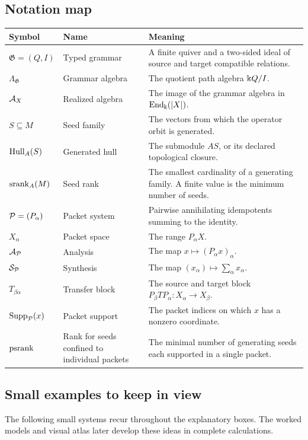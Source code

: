 \subsection*{Notation map}
\begin{center}
\begin{longtable}{@{}p{}p{}p{}@{}}
\toprule
\textbf{Symbol} & \textbf{Name} & \textbf{Meaning}\\
\midrule
\endhead
\(\mathfrak G=(Q,I)\) & Typed grammar & A finite quiver and a two-sided ideal of source and target compatible relations.\\
\(\Lambda_{\mathfrak G}\) & Grammar algebra & The quotient path algebra \(\Bbbk Q/I\).\\
\(\mathcal A_X\) & Realized algebra & The image of the grammar algebra in \(\operatorname{End}_{\Bbbk}(|X|)\).\\
\(S\subseteq M\) & Seed family & The vectors from which the operator orbit is generated.\\
\(\operatorname{Hull}_A(S)\) & Generated hull & The submodule \(AS\), or its declared topological closure.\\
\(\operatorname{srank}_A(M)\) & Seed rank & The smallest cardinality of a generating family. A finite value is the minimum number of seeds.\\
\(\mathcal P=(P_\alpha)\) & Packet system & Pairwise annihilating idempotents summing to the identity.\\
\(X_\alpha\) & Packet space & The range \(P_\alpha X\).\\
\(\mathcal A_{\mathcal P}\) & Analysis & The map \(x\mapsto(P_\alpha x)_\alpha\).\\
\(\mathcal S_{\mathcal P}\) & Synthesis & The map \((x_\alpha)\mapsto\sum_\alpha x_\alpha\).\\
\(T_{\beta\alpha}\) & Transfer block & The source and target block \(P_\beta TP_\alpha:X_\alpha\to X_\beta\).\\
\(\operatorname{Supp}_{\mathcal P}(x)\) & Packet support & The packet indices on which \(x\) has a nonzero coordinate.\\
\(\operatorname{psrank}\) & Rank for seeds confined to individual packets & The minimal number of generating seeds each supported in a single packet.\\
\bottomrule
\end{longtable}
\end{center}

\subsection*{Small examples to keep in view}
The following small systems recur throughout the explanatory boxes. The worked models and visual atlas later develop these ideas in complete calculations.

